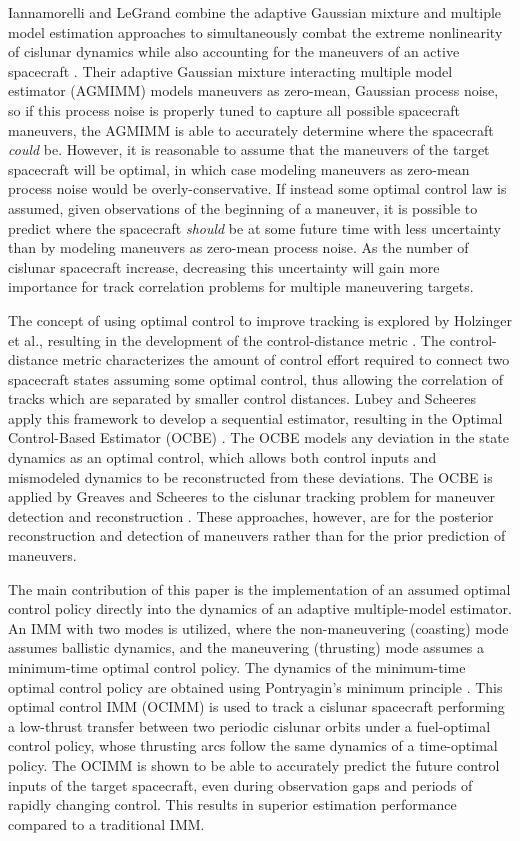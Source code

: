 \documentclass[letterpaper, preprint, paper,11pt]{AAS}	%
\begin{document}
Iannamorelli and LeGrand combine the adaptive Gaussian mixture and multiple model estimation approaches to simultaneously combat the extreme nonlinearity of cislunar dynamics while also accounting for the maneuvers of an active spacecraft \cite{iannamorelli2025adaptive}. Their adaptive Gaussian mixture interacting multiple model estimator (AGMIMM) models maneuvers as zero-mean, Gaussian process noise, so if this process noise is properly tuned to capture all possible spacecraft maneuvers, the AGMIMM is able to accurately determine where the spacecraft \textit{could} be. However, it is reasonable to assume that the maneuvers of the target spacecraft will be optimal, in which case modeling maneuvers as zero-mean process noise would be overly-conservative. If instead some optimal control law is assumed, given observations of the beginning of a maneuver, it is possible to predict where the spacecraft \textit{should} be at some future time with less uncertainty than by modeling maneuvers as zero-mean process noise. As the number of cislunar spacecraft increase, decreasing this uncertainty will gain more importance for track correlation problems for multiple maneuvering targets.

The concept of using optimal control to improve tracking is explored by Holzinger et al., resulting in the development of the control-distance metric \cite{holzinger2012object}. The control-distance metric characterizes the amount of control effort required to connect two spacecraft states assuming some optimal control, thus allowing the correlation of tracks which are separated by smaller control distances. Lubey and Scheeres apply this framework to develop a sequential estimator, resulting in the Optimal Control-Based Estimator (OCBE) \cite{lubey2013optimal}. The OCBE models any deviation in the state dynamics as an optimal control, which allows both control inputs and mismodeled dynamics to be reconstructed from these deviations. The OCBE is applied by Greaves and Scheeres to the cislunar tracking problem for maneuver detection and reconstruction \cite{greaves2021observation}. These approaches, however, are for the posterior reconstruction and detection of maneuvers rather than for the prior prediction of maneuvers. 

The main contribution of this paper is the implementation of an assumed optimal control policy directly into the dynamics of an adaptive multiple-model estimator. An IMM with two modes is utilized, where the non-maneuvering (coasting) mode assumes ballistic dynamics, and the maneuvering (thrusting) mode assumes a minimum-time optimal control policy. The dynamics of the minimum-time optimal control policy are obtained using Pontryagin's minimum principle \cite{pontryagin1962}. This optimal control IMM (OCIMM) is used to track a cislunar spacecraft performing a low-thrust transfer between two periodic cislunar orbits under a fuel-optimal control policy, whose thrusting arcs follow the same dynamics of a time-optimal policy. The OCIMM is shown to be able to accurately predict the future control inputs of the target spacecraft, even during observation gaps and periods of rapidly changing control. This results in superior estimation performance compared to a traditional IMM. 
\end{document}
